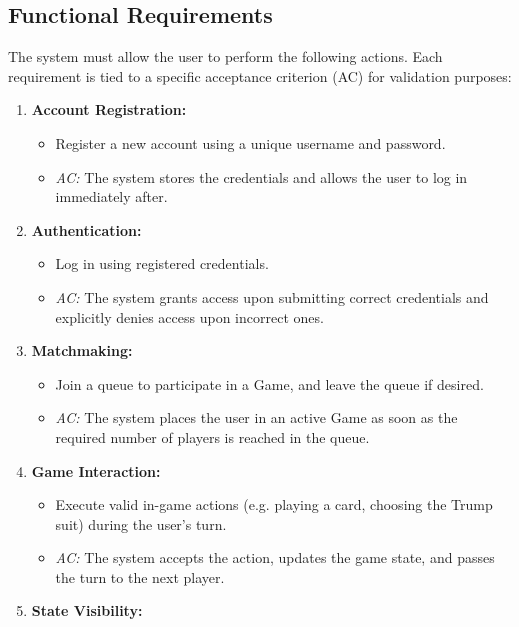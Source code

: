 \documentclass{scrartcl}
\begin{document}
\subsection*{Functional Requirements}
The system must allow the user to perform the following actions. Each requirement is tied to a specific acceptance criterion (AC) for validation purposes:
\begin{enumerate}[label=F\arabic*.,ref=F\arabic*]
    \item \label{f:account-registration} \textbf{Account Registration:}
    \begin{itemize}
        \item Register a new account using a unique username and password.
        \item \textit{AC:} The system stores the credentials and allows the user to log in immediately after.
    \end{itemize}
    \item \label{f:authentication} \textbf{Authentication:}
    \begin{itemize}
        \item Log in using registered credentials.
        \item \textit{AC:} The system grants access upon submitting correct credentials and explicitly denies access upon incorrect ones.
    \end{itemize}
    \item \label{f:matchmaking} \textbf{Matchmaking:} 
    \begin{itemize}
        \item Join a queue to participate in a Game, and leave the queue if desired.
        \item \textit{AC:} The system places the user in an active Game as soon as the required number of players is reached in the queue.
    \end{itemize}
    \item \label{f:game-interaction} \textbf{Game Interaction:}
    \begin{itemize}
        \item Execute valid in-game actions (e.g. playing a card, choosing the Trump suit) during the user's turn.
        \item \textit{AC:} The system accepts the action, updates the game state, and passes the turn to the next player.
    \end{itemize}
    \item \label{f:state-visibility} \textbf{State Visibility:}
    \begin{itemize}

\end{itemize}
\end{enumerate}
\end{document}
